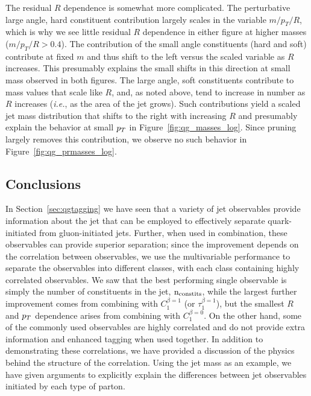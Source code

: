 The residual $R$ dependence is somewhat more complicated.  
The perturbative large angle, hard constituent contribution
largely scales in the variable $m/p_T/R$, which is why we see little residual $R$ dependence in either figure at higher masses ($m/p_T/R > 0.4$).  
The contribution of the small angle constituents (hard and soft) contribute at fixed $m$ and thus shift to the left versus the scaled variable as $R$ increases.  
This presumably explains the small shifts in this direction at small mass observed in both figures.
The large angle, soft constituents contribute to mass values that scale like $R$, and, as noted above, tend to increase in number as $R$ increases 
(\textit{i.e.}, as the area of the jet grows).  Such contributions  yield a scaled jet mass
distribution that shifts to the right with increasing $R$  and presumably explain the behavior at small $p_T$ in Figure~\ref{fig:qg_masses_log}.  Since pruning
largely removes this contribution, we observe no such behavior in Figure~\ref{fig:qg_prmasses_log}. 

 \subsection{Conclusions}\label{sec:qg_concl}

In Section~\ref{sec:qgtagging} we have seen that a variety of jet observables
 provide information about the jet that can be employed  to effectively separate quark-initiated from gluon-initiated jets.  Further,
when used in combination, these observables can provide superior separation; since the improvement depends on the correlation between observables,
we use the multivariable performance to separate the observables into different classes, with each class containing highly correlated observables.  
We saw that the best performing single observable is simply the number of
constituents in the jet, $\rm{n_ {\rm constits}}$,  while the largest further improvement comes from combining with $C_1^{\beta =1}$ (or $\tau_1^{\beta=1}$), 
but the smallest
$R$ and $p_T$ dependence arises from combining with $C_1^{\beta = 0}$.  On the other hand, some of the commonly used observables are highly correlated
and do not provide extra information and enhanced tagging when used together.  In addition to demonstrating these correlations, we have provided a discussion of the 
physics behind the structure of the correlation.  Using the jet mass as an example, we have given arguments to explicitly explain the differences between jet observables 
initiated by each type of parton. 


